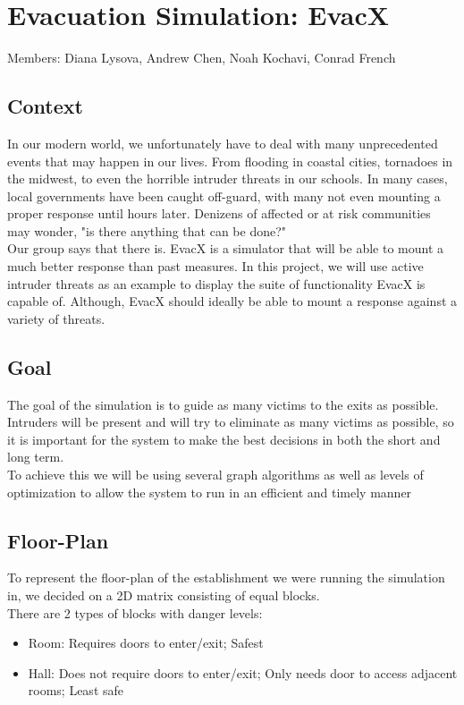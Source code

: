 \documentclass[12pt]{article}
\begin{document}
\section*{\huge Evacuation Simulation: EvacX}
Members: Diana Lysova, Andrew Chen, Noah Kochavi, Conrad French 
\subsection*{Context} 
\hspace*{6mm} In our modern world, we unfortunately have to deal with many unprecedented events that may happen in our lives. From flooding in coastal cities, tornadoes in the midwest, to even the horrible intruder threats in our schools. In many cases, local governments have been caught off-guard, with many not even mounting a proper response until hours later. Denizens of affected or at risk communities may wonder, "is there anything that can be done?" \\[5pt]
\hspace*{6mm} Our group says that there is. EvacX is a simulator that will be able to mount a much better response than past measures. In this project, we will use active intruder threats as an example to display the suite of functionality EvacX is capable of. Although, EvacX should ideally be able to mount a response against a variety of threats.
\subsection*{Goal}
\hspace*{6mm} The goal of the simulation is to guide as many victims to the exits as possible. Intruders will be present and will try to eliminate as many victims as possible, so it is important for the system to make the best decisions in both the short and long term.\\[5pt]
\hspace*{6mm} To achieve this we will be using several graph algorithms as well as levels of optimization to allow the system to run in an efficient and timely manner
\subsection*{Floor-Plan}
To represent the floor-plan of the establishment we were running the simulation in, we decided on a 2D matrix consisting of equal blocks.\\[5pt]
There are 2 types of blocks with danger levels:
\begin{itemize}
\item Room: Requires doors to enter/exit; Safest
\item Hall: Does not require doors to enter/exit; Only needs door 	  to access adjacent rooms; Least safe
\end{itemize}
\end{document}
